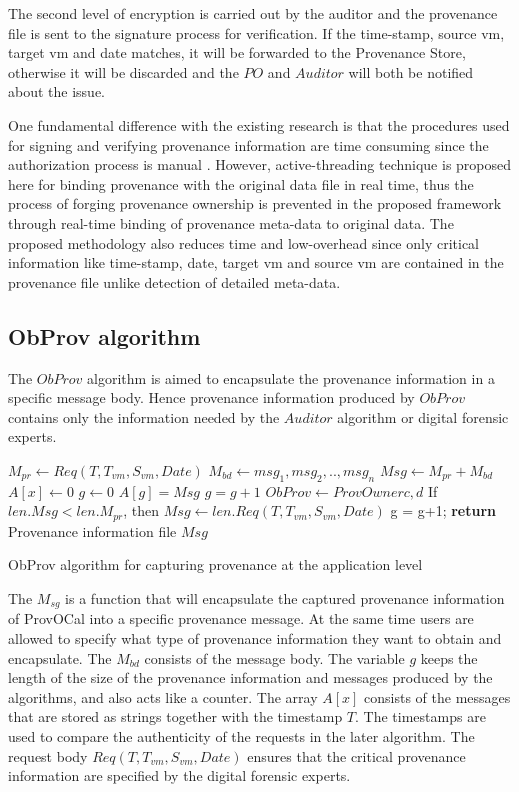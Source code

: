 \documentclass[conference]{IEEEtran}
\begin{document}
The second level of encryption is carried out by the auditor and the provenance file is sent to the signature process for verification. If the time-stamp, source vm, target vm and date matches, it will be forwarded to the Provenance Store, otherwise it will be discarded and the $PO$ and $Auditor$ will both be notified about the issue.

One fundamental difference with the existing research is that the procedures used for signing and verifying provenance information are time consuming since the authorization process is manual \cite{zhang2012track}. However, active-threading technique is proposed here for binding provenance with the original data file in real time, thus the process of forging provenance ownership is prevented in the proposed framework through real-time binding of provenance meta-data to original data. The proposed methodology also reduces time and low-overhead since only critical information like time-stamp, date, target vm and source vm are contained in the provenance file unlike detection of detailed meta-data.


\subsection{ObProv algorithm}

The $ObProv$ algorithm is aimed to encapsulate the provenance information in a specific message body. Hence provenance information produced by $ObProv$ contains only the information needed by the $Auditor$ algorithm or digital forensic experts.

\begin{algorithm}
 \begin{algorithmic}[1]
 \State $M_{pr}\gets Req(T, T_{vm}, S_{vm}, Date)$
 \State $M_{bd}\gets{msg_{1}, msg_{2},.., msg_{n}}$
 \State $Msg\gets{M_{pr}+M_{bd}}$
 \State $A[x]\gets0$
 \State $g\gets 0$
 \State $A[g]=Msg$
 \State $g=g+1$
 \State $ObProv\gets ProvOwner{c,d}$
 \EndWhile
 \State If $len.Msg<len.M_{pr}$, then
 \State $Msg\gets len.Req(T, T_{vm}, S_{vm}, Date)$
 \State g = g+1;
 \State \textbf{return} Provenance information file $Msg$
  \EndProcedure
 \end{algorithmic}
 \caption{ObProv algorithm for capturing provenance at the application level}
 \label{euclid}
\end{algorithm}

The $M_{sg}$ is a function that will encapsulate the captured provenance information of ProvOCal into a specific provenance message. At the same time users are allowed to specify what type of provenance information they want to obtain and encapsulate. The $M_{bd}$ consists of the message body. The variable $g$ keeps the length of the size of the provenance information and messages produced by the algorithms, and also acts like a counter. The array $A[x]$ consists of the messages that are stored as strings together with the timestamp $T$. The timestamps are used to compare the authenticity of the requests in the later algorithm. The request body $Req(T,T_{vm},S_{vm},Date)$ ensures that the critical provenance information are specified by the digital forensic experts.
\end{document}
